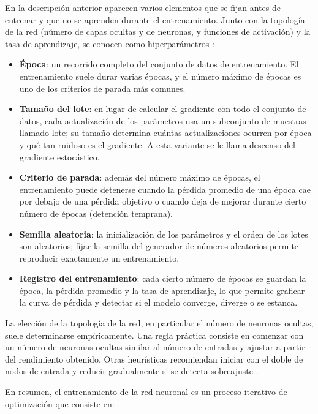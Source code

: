 En la descripción anterior aparecen varios elementos que se fijan antes de entrenar y que no se aprenden durante el entrenamiento. Junto con la topología de la red (número de capas ocultas y de neuronas, y funciones de activación) y la tasa de aprendizaje, se conocen como hiperparámetros \cite{goodfellow2016_dl}:

\begin{itemize}
	\item \textbf{Época}: un recorrido completo del conjunto de datos de entrenamiento. El entrenamiento suele durar varias épocas, y el número máximo de épocas es uno de los criterios de parada más comunes.
	\item \textbf{Tamaño del lote}: en lugar de calcular el gradiente con todo el conjunto de datos, cada actualización de los parámetros usa un subconjunto de muestras llamado lote; su tamaño determina cuántas actualizaciones ocurren por época y qué tan ruidoso es el gradiente. A esta variante se le llama descenso del gradiente estocástico.
	\item \textbf{Criterio de parada}: además del número máximo de épocas, el entrenamiento puede detenerse cuando la pérdida promedio de una época cae por debajo de una pérdida objetivo o cuando deja de mejorar durante cierto número de épocas (detención temprana).
	\item \textbf{Semilla aleatoria}: la inicialización de los parámetros y el orden de los lotes son aleatorios; fijar la semilla del generador de números aleatorios permite reproducir exactamente un entrenamiento.
	\item \textbf{Registro del entrenamiento}: cada cierto número de épocas se guardan la época, la pérdida promedio y la tasa de aprendizaje, lo que permite graficar la curva de pérdida y detectar si el modelo converge, diverge o se estanca.
\end{itemize}

La elección de la topología de la red, en particular el número de neuronas ocultas, suele determinarse empíricamente. Una regla práctica consiste en comenzar con un número de neuronas ocultas similar al número de entradas y ajustar a partir del rendimiento obtenido. Otras heurísticas recomiendan iniciar con el doble de nodos de entrada y reducir gradualmente si se detecta sobreajuste \cite{matich2001_ann}.

En resumen, el entrenamiento de la red neuronal es un proceso iterativo de optimización que consiste en:

